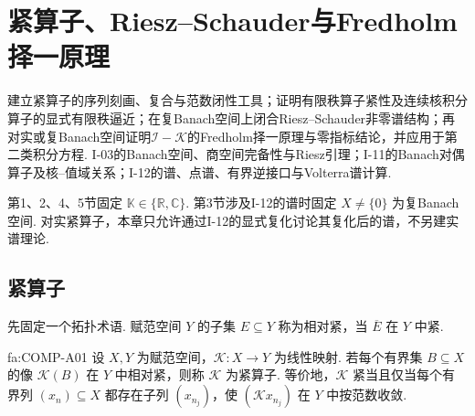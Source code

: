 \chapter{紧算子、Riesz--Schauder与Fredholm择一原理}\label{chap:I-13}
\FAChapterOpening
{建立紧算子的序列刻画、复合与范数闭性工具；证明有限秩算子紧性及连续核积分算子的显式有限秩逼近；在复Banach空间上闭合Riesz--Schauder非零谱结构；再对实或复Banach空间证明\(\displaystyle \mathcal I-\mathcal K\)的Fredholm择一原理与零指标结论，并应用于第二类积分方程.}
{I-03的Banach空间、商空间完备性与Riesz引理；I-11的Banach对偶算子及核--值域关系；I-12的谱、点谱、有界逆接口与Volterra谱计算.}
{\begin{center}
\end{center}}

第1、2、4、5节固定 \(\displaystyle \mathbb K\in\{\mathbb R,\mathbb C\}\). 第3节涉及I-12的谱时固定 \(\displaystyle X\neq\{0\}\) 为复Banach空间. 对实紧算子，本章只允许通过I-12的显式复化讨论其复化后的谱，不另建实谱理论.

\section{紧算子}\label{sec:i13-compact}

先固定一个拓扑术语. 赋范空间 \(\displaystyle Y\) 的子集 \(\displaystyle E\subseteq Y\) 称为相对紧，当 \(\displaystyle \overline E\) 在 \(\displaystyle Y\) 中紧.

\begin{FADefinition}[A][紧算子及其序列刻画]{fa:COMP-A01}
设 \(\displaystyle X,Y\) 为赋范空间，\(\displaystyle \mathcal K:X\to Y\) 为线性映射. 若每个有界集 \(\displaystyle B\subseteq X\) 的像 \(\displaystyle \mathcal K(B)\) 在 \(\displaystyle Y\) 中相对紧，则称 \(\displaystyle \mathcal K\) 为紧算子. 等价地，\(\displaystyle \mathcal K\) 紧当且仅当每个有界列 \(\displaystyle (x_n)\subseteq X\) 都存在子列 \(\displaystyle (x_{n_j})\)，使 \(\displaystyle (\mathcal Kx_{n_j})\) 在 \(\displaystyle Y\) 中按范数收敛.
\end{FADefinition}

